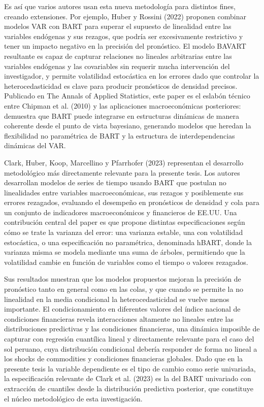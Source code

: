 ﻿\documentclass[11pt,a4paper]{article}
\begin{document}
Es así que varios autores usan esta nueva metodología para distintos fines, creando extensiones. Por ejemplo, Huber y Rossini (2022) proponen combinar modelos VAR con BART para superar el supuesto de linealidad entre las variables endógenas y sus rezagos, que podría ser excesivamente restrictivo y tener un impacto negativo en la precisión del pronóstico. El modelo BAVART resultante es capaz de capturar relaciones no lineales arbitrarias entre las variables endógenas y las covariables sin requerir mucha intervención del investigador, y permite volatilidad estocástica en los errores dado que controlar la heterocedasticidad es clave para producir pronósticos de densidad precisos. Publicado en The Annals of Applied Statistics, este paper es el eslabón técnico entre Chipman et al. (2010) y las aplicaciones macroeconómicas posteriores: demuestra que BART puede integrarse en estructuras dinámicas de manera coherente desde el punto de vista bayesiano, generando modelos que heredan la flexibilidad no paramétrica de BART y la estructura de interdependencias dinámicas del VAR.


Clark, Huber, Koop, Marcellino y Pfarrhofer (2023) representan el desarrollo metodológico más directamente relevante para la presente tesis. Los autores desarrollan modelos de series de tiempo usando BART que postulan no linealidades entre variables macroeconómicas, sus rezagos y posiblemente sus errores rezagados, evaluando el desempeño en pronósticos de densidad y cola para un conjunto de indicadores macroeconómicos y financieros de EE.UU. Una contribución central del paper es que propone distintas especificaciones según cómo se trate la varianza del error: una varianza estable, una con volatilidad estocástica, o una especificación no paramétrica, denominada hBART, donde la varianza misma se modela mediante una suma de árboles, permitiendo que la volatilidad cambie en función de variables como el tiempo o valores rezagados.


Sus resultados muestran que los modelos propuestos mejoran la precisión de pronóstico tanto en general como en las colas, y que cuando se permite la no linealidad en la media condicional la heterocedasticidad se vuelve menos importante. El condicionamiento en diferentes valores del índice nacional de condiciones financieras revela interacciones altamente no lineales entre las distribuciones predictivas y las condiciones financieras, una dinámica imposible de capturar con regresión cuantílica lineal y directamente relevante para el caso del sol peruano, cuya distribución condicional debería responder de forma no lineal a los shocks de commodities y condiciones financieras globales. Dado que en la presente tesis la variable dependiente es el tipo de cambio como serie univariada, la especificación relevante de Clark et al. (2023) es la del BART univariado con extracción de cuantiles desde la distribución predictiva posterior, que constituye el núcleo metodológico de esta investigación.
\end{document}
